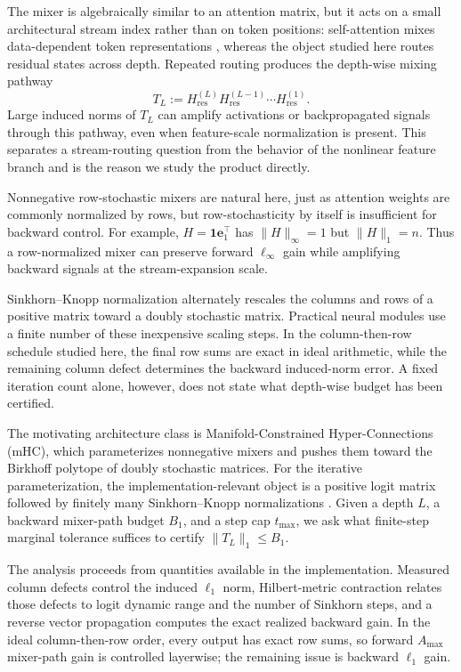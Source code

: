 \documentclass[10pt]{article}
\numberwithin{equation}{section}
\theoremstyle{plain}
\theoremstyle{definition}
\theoremstyle{remark}
\newcommand{\ones}{\mathbf{1}}
\newcommand{\Hres}{H_{\mathrm{res}}}
\begin{document}
The mixer is algebraically similar to an attention matrix, but it acts on a
small architectural stream index rather than on token positions: self-attention
mixes data-dependent token representations \citep{Vaswani2017Attention}, whereas
the object studied here routes residual states across depth.  Repeated routing
produces the depth-wise mixing pathway
\begin{equation}\label{eq:TLdef}
T_L := \Hres^{(L)}\Hres^{(L-1)}\cdots \Hres^{(1)} .
\end{equation}
Large induced norms of \(T_L\) can amplify activations or backpropagated signals
through this pathway, even when feature-scale normalization is present.  This
separates a stream-routing question from the behavior of the nonlinear feature
branch and is the reason we study the product directly.

Nonnegative row-stochastic mixers are natural here, just as attention weights
are commonly normalized by rows, but row-stochasticity by itself is insufficient
for backward control.  For example,
\(H=\ones\mathbf e_1^\top\) has \(\|H\|_\infty=1\) but \(\|H\|_1=n\).  Thus a
row-normalized mixer can preserve forward \(\ell_\infty\) gain while amplifying
backward signals at the stream-expansion scale.

Sinkhorn--Knopp normalization alternately rescales the columns and rows of a
positive matrix toward a doubly stochastic matrix.  Practical neural modules use a
finite number of these inexpensive scaling steps.  In the column-then-row
schedule studied here, the final row sums are exact in ideal arithmetic, while
the remaining column defect determines the backward induced-norm error.  A fixed
iteration count alone, however, does not state what depth-wise budget has been
certified.

The motivating architecture class is Manifold-Constrained Hyper-Connections
(mHC), which parameterizes nonnegative mixers and pushes them toward the
Birkhoff polytope of doubly stochastic matrices.  For the iterative
parameterization, the implementation-relevant object is a positive logit matrix
followed by finitely many Sinkhorn--Knopp normalizations
\citep{SinkhornKnopp1967,Knight2008}.  Given a depth \(L\), a backward
mixer-path budget \(B_1\), and a step cap \(t_{\max}\), we ask what finite-step
marginal tolerance suffices to certify \(\|T_L\|_1\le B_1\).

The analysis proceeds from quantities available in the implementation. Measured
column defects control the induced \(\ell_1\) norm, Hilbert-metric contraction relates
those defects to logit dynamic range and the number of Sinkhorn steps, and a reverse
vector propagation computes the exact realized backward gain. In the ideal
column-then-row order, every output has exact row sums, so forward \(A_{\max}\)
mixer-path gain is controlled layerwise; the remaining issue is backward \(\ell_1\)
gain.
\end{document}
